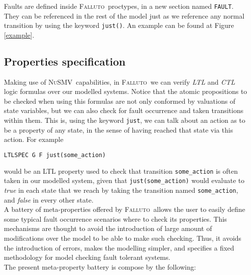 \documentclass{llncs2e/llncs}
\newcommand{\nusmvSp}{\mbox{\textsc{NuSMV~}}}
\newcommand{\fallutoSp}{\nohyphens{\textsc{Falluto~}}}  %
\newcommand{\textfll}[1]{\texttt{#1}}                   %
\begin{document}
Faults are defined inside \fallutoSp proctypes, in a new section named \textfll{FAULT}. They can be referenced in the rest of the model just as we reference any normal transition by using the keyword \textfll{just()}. An example can be found at Figure \ref{example}.

\subsection{Properties specification}
Making use of \nusmvSp capabilities, in \fallutoSp we can verify \textit{LTL} and \textit{CTL} logic formulas over our modelled systems. Notice that the atomic propositions to be checked when using this formulas are not only conformed by valuations of state variables, but we can also check for fault occurrence and taken transitions within them. This is, using the keyword \textfll{just}, we can talk about an action as to be a property of any state, in the sense of having reached that state via this action. For example
\begin{center}
\textfll{LTLSPEC G F just(some\_action)}
\end{center}
would be an LTL property used to check that transition \textfll{some\_action} is often taken in our modelled system, given that \textfll{just(some\_action)} would evaluate to \textit{true} in each state that we reach by taking the transition named \textfll{some\_action}, and \textit{false} in every other state.\\
A battery of meta-properties offered by \fallutoSp allows the user to easily define some typical fault occurrence scenarios where to check its properties. This mechanisms are thought to avoid the introduction of large amount of modifications over the model to be able to make such checking. Thus, it avoids the introduction of errors, makes the modelling simpler, and specifies a fixed methodology for model checking fault tolerant systems.\\
The present meta-property battery is compose by the following:
\end{document}
